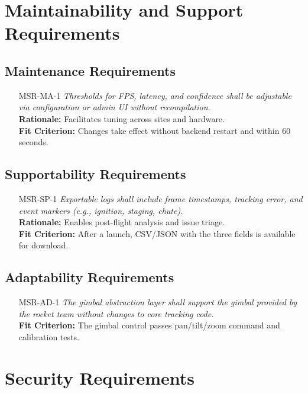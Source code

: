 \documentclass[12pt]{article}
\begin{document}
\section{Maintainability and Support Requirements}
\subsection{Maintenance Requirements}
\begin{itemize}[leftmargin=*]
  \item[MSR-MA-1] \emph{Thresholds for FPS, latency, and confidence shall be adjustable
          via configuration or admin UI without recompilation.}\\ \textbf{Rationale:}
        Facilitates tuning across sites and hardware.\\ \textbf{Fit Criterion:} Changes
        take effect without backend restart and within 60 seconds.
\end{itemize}

\subsection{Supportability Requirements}
\begin{itemize}[leftmargin=*]
  \item[MSR-SP-1] \emph{Exportable logs shall include frame timestamps, tracking error,
          and event markers (e.g., ignition, staging, chute).}\\ \textbf{Rationale:}
        Enables post-flight analysis and issue triage.\\ \textbf{Fit Criterion:} After
        a launch, CSV/JSON with the three fields is available for download.
\end{itemize}

\subsection{Adaptability Requirements}
\begin{itemize}[leftmargin=*]
  \item[MSR-AD-1] \emph{The gimbal abstraction layer shall support the gimbal provided
          by the rocket team without changes to core tracking code.}\\ \textbf{Fit
          Criterion:} The gimbal control passes pan/tilt/zoom command and calibration
        tests.
\end{itemize}

\section{Security Requirements}
\end{document}
